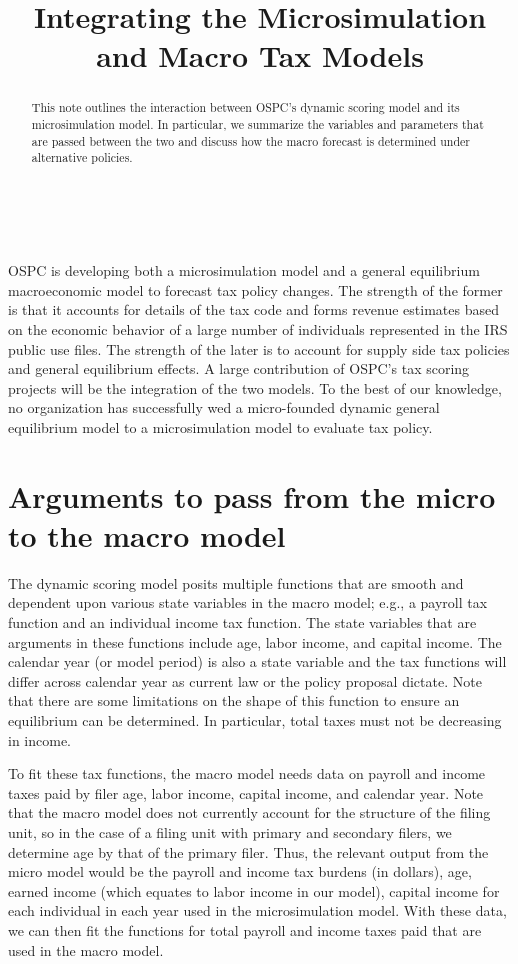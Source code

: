 \documentclass[letterpaper,11pt]{article}
\theoremstyle{definition}
\begin{document}
\title{Integrating the Microsimulation and Macro Tax Models}
\maketitle

\begin{abstract}
\small{This note outlines the interaction between OSPC's dynamic scoring model and its microsimulation model.  In particular, we summarize the variables and parameters that are passed between the two and discuss how the macro forecast is determined under alternative policies.}
\end{abstract}

\ \\
\ \\

OSPC is developing both a microsimulation model and a general equilibrium macroeconomic model to forecast tax policy changes.  The strength of the former is that it accounts for details of the tax code and forms revenue estimates based on the economic behavior of a large number of individuals represented in the IRS public use files.  The strength of the later is to account for supply side tax policies and general equilibrium effects.  A large contribution of OSPC's tax scoring projects will be the integration of the two models.  To the best of our knowledge, no organization has successfully wed a micro-founded dynamic general equilibrium model to a microsimulation model to evaluate tax policy.

\section{Arguments to pass from the micro to the macro model}

The dynamic scoring model posits multiple functions that are smooth and dependent upon various state variables in the macro model; e.g., a payroll tax function and an individual income tax function. The state variables that are arguments in these functions include age, labor income, and capital income. The calendar year (or model period) is also a state variable and the tax functions will differ across calendar year as current law or the policy proposal dictate.  Note that there are some limitations on the shape of this function to ensure an equilibrium can be determined.  In particular, total taxes must not be decreasing in income.

To fit these tax functions, the macro model needs data on payroll and income taxes paid by filer age, labor income, capital income, and calendar year. Note that the macro model does not currently account for the structure of the filing unit, so in the case of a filing unit with primary and secondary filers, we determine age by that of the primary filer. Thus, the relevant output from the micro model would be the payroll and income tax burdens (in dollars), age, earned income (which equates to labor income in our model), capital income for each individual in each year used in the microsimulation model. With these data, we can then fit the functions for total payroll and income taxes paid that are used in the macro model.
\end{document}
